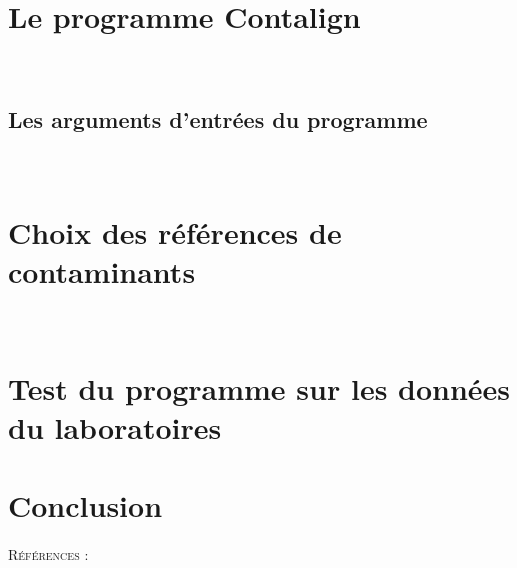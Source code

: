 \documentclass[a4paper,12pt]{article}
\begin{document}
\section{Le programme Contalign}
\paragraph{}


\\
\subsection{Les arguments d'entrées du programme}
\paragraph{}

\\
\section{Choix des références de contaminants}

\\
\section{Test du programme sur les données du laboratoires}



\section{Conclusion}
\paragraph{}


\textsc{\large Références :}\\[1.5cm]

 
 
\end{document}
